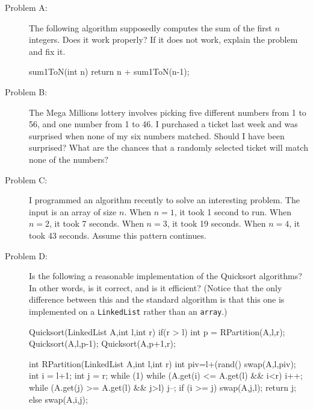 \begin{description}
\item[Problem A:]
The following algorithm supposedly computes the sum of the first $n$ integers.  
Does it work properly?  If it does not work, explain the problem and fix it.
\begin{code}
    sum1ToN(int n) {
        return n + sum1ToN(n-1);
    }
\end{code}



\item[Problem B:]
The Mega Millions lottery involves picking five different numbers from 1 to 56, 
and one number from 1 to 46.  
I purchased a ticket last week and was surprised when none of my six numbers matched.  
Should I have been surprised?  
What are the chances that a randomly selected ticket will match none of the numbers?


\item[Problem C:]
I programmed an algorithm recently to solve an interesting problem.  
The input is an array of size $n$.  
When $n=1$, it took 1 second to run.  When $n=2$, it took 7 seconds.  When $n=3$, it took 19 seconds.  
When $n=4$, it took 43 seconds.  
Assume this pattern continues.



\item[Problem D:]
Is the following a reasonable implementation of the {\sc Quicksort} algorithms?
In other words, is it correct, and is it efficient?
(Notice that the only difference between this and the standard algorithm is that
this one is implemented on a \verb+LinkedList+ rather than an \verb+array+.)
\begin{code}
	Quicksort(LinkedList A,int l,int r) {
	   if(r > l) {
	      int p = RPartition(A,l,r);
	      Quicksort(A,l,p-1);
	      Quicksort(A,p+1,r);
	   }
	}
	
	int RPartition(LinkedList A,int l,int r) {
	    int piv=l+(rand()%
	    swap(A,l,piv);
	    int i = l+1;
	    int j = r;
	    while (1) {
	        while (A.get(i) <= A.get(l) && i<r) 
	            i++;
	        while (A.get(j) >= A.get(l) && j>l) 
	            j--;
	        if (i >= j) {
	            swap(A,j,l);
	            return j;
	        } else {
	            swap(A,i,j);
	        }
	    }
	}


\end{code}
\end{description}
